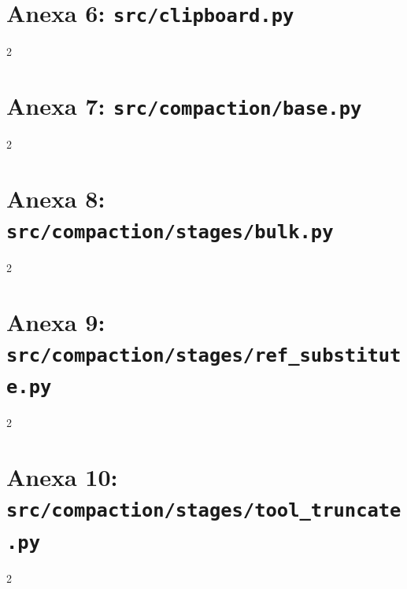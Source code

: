 \section*{Anexa 6: \texttt{src/clipboard.py}}
\begin{multicols}{2}

\end{multicols}


\section*{Anexa 7: \texttt{src/compaction/base.py}}
\begin{multicols}{2}

\end{multicols}


\section*{Anexa 8: \texttt{src/compaction/stages/bulk.py}}
\begin{multicols}{2}

\end{multicols}


\section*{Anexa 9: \texttt{src/compaction/stages/ref\_substitute.py}}
\begin{multicols}{2}

\end{multicols}


\section*{Anexa 10: \texttt{src/compaction/stages/tool\_truncate.py}}
\begin{multicols}{2}

\end{multicols}


